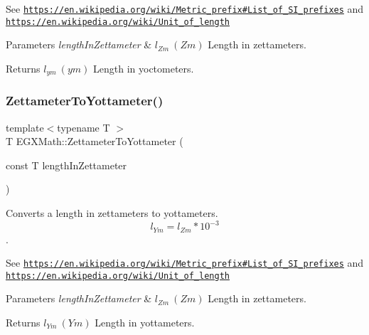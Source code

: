 See \href{https://en.wikipedia.org/wiki/Metric_prefix#List_of_SI_prefixes}{\tt https\+://en.\+wikipedia.\+org/wiki/\+Metric\+\_\+prefix\#\+List\+\_\+of\+\_\+\+S\+I\+\_\+prefixes} and \href{https://en.wikipedia.org/wiki/Unit_of_length}{\tt https\+://en.\+wikipedia.\+org/wiki/\+Unit\+\_\+of\+\_\+length} 
\begin{DoxyParams}{Parameters}
{\em length\+In\+Zettameter} & $ l_{Zm}\ (Zm)$ Length in zettameters. \\
\hline
\end{DoxyParams}
\begin{DoxyReturn}{Returns}
$ l_{ym}\ (ym)$ Length in yoctometers. 
\end{DoxyReturn}
\mbox{\label{group___e_g_x_math-_conversions-_length_conversions-_s_i-_zettameter-_s_i_ga50b4ccf902ce36f4519ce580bf2234d4}} 
\subsubsection{\texorpdfstring{Zettameter\+To\+Yottameter()}{ZettameterToYottameter()}}
{\footnotesize\ttfamily template$<$typename T $>$ \\
T E\+G\+X\+Math\+::\+Zettameter\+To\+Yottameter (\begin{DoxyParamCaption}\item[{const T}]{length\+In\+Zettameter }\end{DoxyParamCaption})}



Converts a length in zettameters to yottameters. \[ l_{Ym}=l_{Zm} * 10^{-3} \]. 

See \href{https://en.wikipedia.org/wiki/Metric_prefix#List_of_SI_prefixes}{\tt https\+://en.\+wikipedia.\+org/wiki/\+Metric\+\_\+prefix\#\+List\+\_\+of\+\_\+\+S\+I\+\_\+prefixes} and \href{https://en.wikipedia.org/wiki/Unit_of_length}{\tt https\+://en.\+wikipedia.\+org/wiki/\+Unit\+\_\+of\+\_\+length} 
\begin{DoxyParams}{Parameters}
{\em length\+In\+Zettameter} & $ l_{Zm}\ (Zm)$ Length in zettameters. \\
\hline
\end{DoxyParams}
\begin{DoxyReturn}{Returns}
$ l_{Ym}\ (Ym)$ Length in yottameters. 
\end{DoxyReturn}
\mbox{\label{group___e_g_x_math-_conversions-_length_conversions-_s_i-_zettameter-_s_i_gab9f9d7e92a7aaf47b4b822163cd700c7}} 
